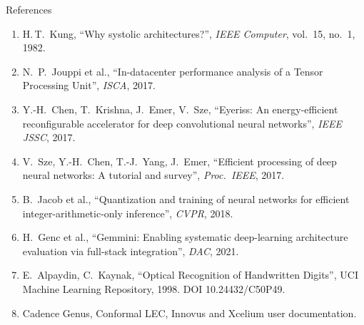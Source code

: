 \documentclass[aspectratio=169,10pt,t]{beamer}
\begin{document}
\begin{frame}{References}
  \footnotesize
  \begin{enumerate}\setlength{\itemsep}{3pt}
    \item H.\,T.\ Kung, ``Why systolic architectures?'', \emph{IEEE Computer}, vol.\ 15, no.\ 1, 1982.
    \item N.\ P.\ Jouppi et al., ``In-datacenter performance analysis of a Tensor Processing Unit'', \emph{ISCA}, 2017.
    \item Y.-H.\ Chen, T.\ Krishna, J.\ Emer, V.\ Sze, ``Eyeriss: An energy-efficient reconfigurable accelerator for deep convolutional neural networks'', \emph{IEEE JSSC}, 2017.
    \item V.\ Sze, Y.-H.\ Chen, T.-J.\ Yang, J.\ Emer, ``Efficient processing of deep neural networks: A tutorial and survey'', \emph{Proc.\ IEEE}, 2017.
    \item B.\ Jacob et al., ``Quantization and training of neural networks for efficient integer-arithmetic-only inference'', \emph{CVPR}, 2018.
    \item H.\ Genc et al., ``Gemmini: Enabling systematic deep-learning architecture evaluation via full-stack integration'', \emph{DAC}, 2021.
    \item E.\ Alpaydin, C.\ Kaynak, ``Optical Recognition of Handwritten Digits'', UCI Machine Learning Repository, 1998. DOI 10.24432/C50P49.
    \item Cadence Genus, Conformal LEC, Innovus and Xcelium user documentation.
  \end{enumerate}
\end{frame}

\begin{frame}[plain]
\end{frame}
\end{document}
